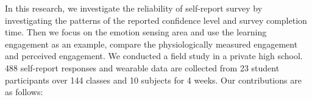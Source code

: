 \documentclass[sigconf]{acmart}
\begin{document}




In this research, we investigate the reliability of self-report survey by investigating the patterns of the reported confidence level and survey completion time. Then we focus on the emotion sensing area and use the learning engagement as an example, compare the physiologically measured engagement and perceived engagement. We conducted a field study in a private high school. 488 self-report responses and wearable data are collected from 23 student participants over 144 classes and 10 subjects for 4 weeks. 
Our contributions are as follows:
\end{document}
